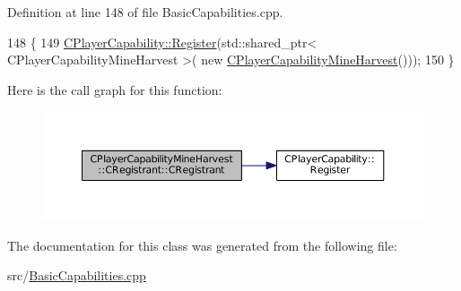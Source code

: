 Definition at line 148 of file Basic\+Capabilities.\+cpp.


\begin{DoxyCode}
148                                                     \{
149     \hyperlink{classCPlayerCapability_a7e298018dcde2684451add3cfff065f7}{CPlayerCapability::Register}(std::shared\_ptr< CPlayerCapabilityMineHarvest >(\textcolor{keyword}{
      new} \hyperlink{classCPlayerCapabilityMineHarvest_aa170d0c33386809d234b73a2b0cf516d}{CPlayerCapabilityMineHarvest}()));   
150 \}
\end{DoxyCode}
Here is the call graph for this function\+:
\nopagebreak
\begin{figure}[H]
\begin{center}
\leavevmode
\includegraphics[width=350pt]{classCPlayerCapabilityMineHarvest_1_1CRegistrant_a5d672b383de5f1539b5ca0cc9f18674d_cgraph}
\end{center}
\end{figure}


The documentation for this class was generated from the following file\+:\begin{DoxyCompactItemize}
\item 
src/\hyperlink{BasicCapabilities_8cpp}{Basic\+Capabilities.\+cpp}\end{DoxyCompactItemize}
